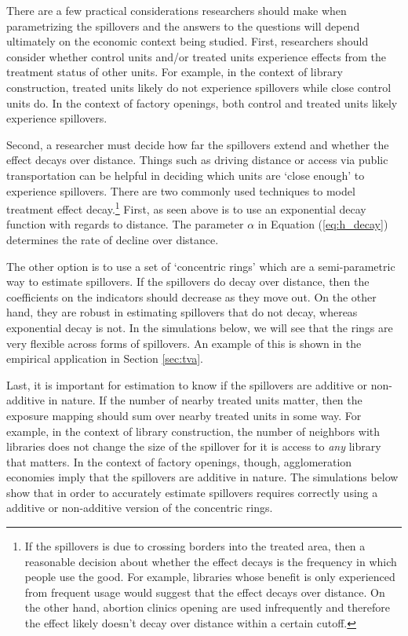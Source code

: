 \documentclass[11pt]{article}
\begin{document}
There are a few practical considerations researchers should make when parametrizing the spillovers and the answers to the questions will depend ultimately on the economic context being studied. First, researchers should consider whether control units and/or treated units experience effects from the treatment status of other units. For example, in the context of library construction, treated units likely do not experience spillovers while close control units do. In the context of factory openings, both control and treated units likely experience spillovers. 

Second, a researcher must decide how far the spillovers extend and whether the effect decays over distance. Things such as driving distance or access via public transportation can be helpful in deciding which units are `close enough' to experience spillovers. There are two commonly used techniques to model treatment effect decay.\footnote{If the spillovers is due to crossing borders into the treated area, then a reasonable decision about whether the effect decays is the frequency in which people use the good. For example, libraries whose benefit is only experienced from frequent usage would suggest that the effect decays over distance. On the other hand, abortion clinics opening are used infrequently and therefore the effect likely doesn't decay over distance within a certain cutoff.} First, as seen above is to use an exponential decay function with regards to distance. The parameter $\alpha$ in Equation (\ref{eq:h_decay}) determines the rate of decline over distance. 

The other option is to use a set of `concentric rings' which are a semi-parametric way to estimate spillovers. If the spillovers do decay over distance, then the coefficients on the indicators should decrease as they move out. On the other hand, they are robust in estimating spillovers that do not decay, whereas exponential decay is not. In the simulations below, we will see that the rings are very flexible across forms of spillovers. An example of this is shown in the empirical application in Section \ref{sec:tva}. 

Last, it is important for estimation to know if the spillovers are additive or non-additive in nature. If the number of nearby treated units matter, then the exposure mapping should sum over nearby treated units in some way. For example, in the context of library construction, the number of neighbors with libraries does not change the size of the spillover for it is access to \textit{any} library that matters. In the context of factory openings, though, agglomeration economies imply that the spillovers are additive in nature. The simulations below show that in order to accurately estimate spillovers requires correctly using a additive or non-additive version of the concentric rings. 
\end{document}
